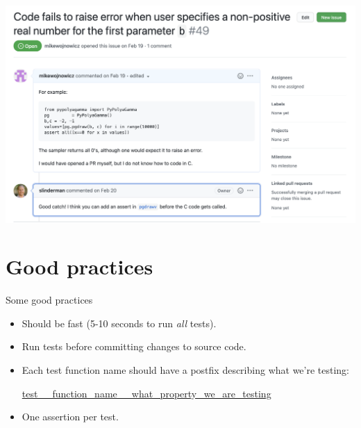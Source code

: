 \documentclass[10pt]{beamer}
\begin{document}
\begin{frame}
\begin{center}
\includegraphics[width=\textwidth]{images/pypolyagamma_issue}	
\end{center}
	
\end{frame}

\section{Good practices}
\begin{frame}{Some good practices}

\begin{itemize}
\item Should be \alert{fast} (5-10 seconds to run \textit{all} tests).
\item Run tests before committing changes to source code. 
\item Each test function name should have a postfix describing what we're testing:
	\begin{center}\url{test__function_name__what_property_we_are_testing}	
	\end{center}
\item One assertion per test.
\end{itemize} 
\end{frame}
\end{document}
